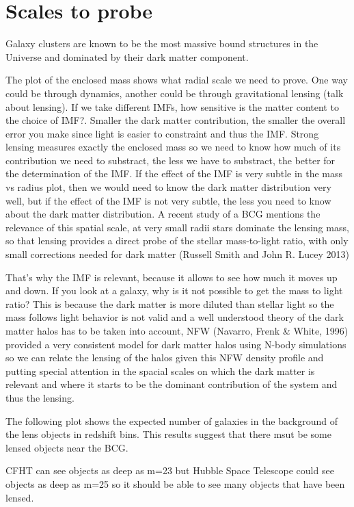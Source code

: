 \chapter{Scales to probe}

Galaxy clusters are known to be the most massive bound structures in the Universe and dominated by their dark matter component.

The plot of the enclosed mass shows what radial scale we need to prove. One way could be through dynamics, another could be through gravitational lensing (talk about lensing). If we take different IMFs, how sensitive is the matter content to the choice of IMF?. Smaller the dark matter contribution, the smaller the overall error you make since light is easier to constraint and thus the IMF. Strong lensing measures exactly the enclosed mass so we need to know how much of its contribution we need to substract, the less we have to substract, the better for the determination of the IMF. If the effect of the IMF is very subtle in the mass vs radius plot, then we would need to know the dark matter distribution very well, but if the effect of the IMF is not very subtle, the less you need to know about the dark matter distribution. A recent study of a BCG mentions the relevance of this spatial scale, at very small radii stars dominate the lensing mass, so that lensing provides a direct probe of the stellar mass-to-light ratio, with only small corrections needed for dark matter (Russell Smith and John R. Lucey 2013) 

That's why the IMF is relevant, because it allows to see how much it moves up and down. If you look at a galaxy, why is it not possible to get the mass to light ratio? This is because the dark matter is more diluted than stellar light so the mass follows light behavior is not valid and a well understood theory of the dark matter halos has to be taken into account, NFW (Navarro, Frenk \& White, 1996) provided a very consistent model for dark matter halos using N-body simulations so we can relate the lensing of the halos given this NFW density profile and putting special attention in the spacial scales on which the dark matter is relevant and where it starts to be the dominant contribution of the system and thus the lensing.

The following plot shows the expected number of galaxies in the background of the lens objects in redshift bins. This results suggest that there msut be some lensed objects near the BCG.

CFHT can see objects as deep as m=23 but Hubble Space Telescope could see objects as deep as m=25 so it should be able to see many objects that have been lensed.

